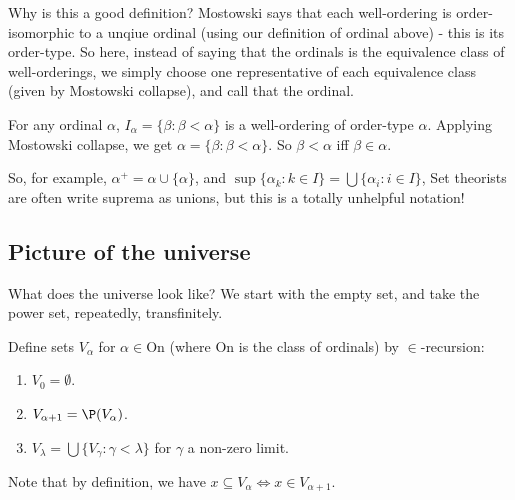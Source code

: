 \documentclass[a4paper]{article}
\begin{document}
Why is this a good definition? Mostowski says that each well-ordering is order-isomorphic to a unqiue ordinal (using our definition of ordinal above) - this is its order-type. So here, instead of saying that the ordinals is the equivalence class of well-orderings, we simply choose one representative of each equivalence class (given by Mostowski collapse), and call that the ordinal.

For any ordinal $\alpha$, $I_\alpha = \{\beta: \beta < \alpha \}$ is a well-ordering of order-type $\alpha$. Applying Mostowski collapse, we get $\alpha = \{\beta: \beta < \alpha\}$. So $\beta < \alpha$ iff $\beta \in \alpha$.

So, for example, $\alpha^+ = \alpha \cup \{\alpha\}$, and $\sup \{\alpha_k: k\in I\} = \bigcup\{\alpha_i: i\in I\}$, Set theorists are often write suprema as unions, but this is a totally unhelpful notation!

\subsection{Picture of the universe}
What does the universe look like? We start with the empty set, and take the power set, repeatedly, transfinitely.

\begin{defi}
  Define sets $V_\alpha$ for $\alpha \in \mathrm{On}$ (where $\mathrm{On}$ is the class of ordinals) by $\in$-recursion:
  \begin{enumerate}
    \item $V_0 = \emptyset$.
    \item $V_{\alpha + 1} = \P(V_\alpha)$.
    \item $V_\lambda = \bigcup\{V_\gamma: \gamma < \lambda\}$ for $\gamma$ a non-zero limit.
  \end{enumerate}
\end{defi}
\begin{center}
\end{center}
Note that by definition, we have $x\subseteq V_\alpha \Leftrightarrow x\in V_{\alpha + 1}$.
\end{document}
